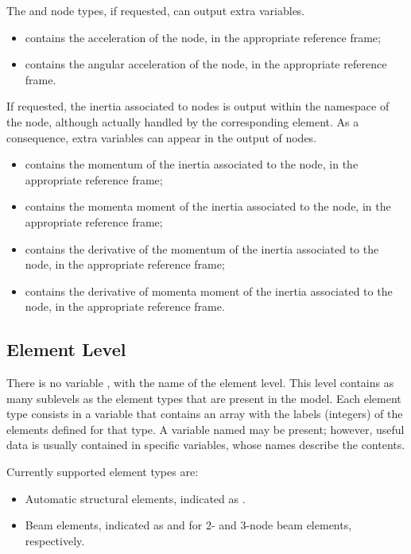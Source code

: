 The  and  node types, if requested, can output
extra variables.
\begin{itemize}
\item {} contains the acceleration of the node,
in the appropriate reference frame;

\item {} contains the angular acceleration
of the node, in the appropriate reference frame.
\end{itemize}

If requested, the inertia associated to  nodes is output
within the namespace of the node, although actually handled
by the corresponding  element.
As a consequence, extra variables can appear in the output
of  nodes.
\begin{itemize}
\item {} contains the momentum of the inertia
associated to the node, in the appropriate reference frame;

\item {} contains the momenta moment of the inertia
associated to the node, in the appropriate reference frame;

\item {} contains the derivative of the momentum
of the inertia associated to the node, in the appropriate reference frame;

\item {} contains the derivative of momenta moment
of the inertia associated to the node, in the appropriate reference frame.
\end{itemize}


\subsection{Element Level}
There is no variable , with the name of the element level.
This level contains as many sublevels as the element types
that are present in the model.
Each element type consists in a variable that contains an array
with the labels (integers) of the elements defined for that type.
A variable named  may be present; however,
useful data is usually contained in specific variables,
whose names describe the contents.

Currently supported element types are:
\begin{itemize}
\item Automatic structural elements, indicated as .
\item Beam elements, indicated as  and 
for 2- and 3-node beam elements, respectively.
\end{itemize}


